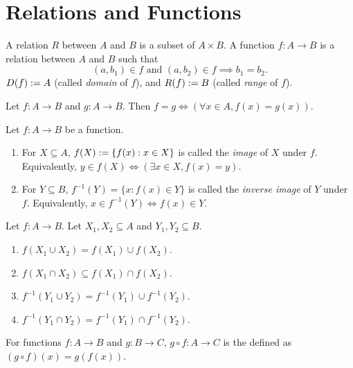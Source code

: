 \documentclass[a4paper, 12pt, fleqn]{article}
\begin{document}
\section{Relations and Functions}

\begin{definition}
A relation $R$ between $A$ and $B$ is a subset of $A \times B$.
A function $f: A \to B$ is a relation between $A$ and $B$ such that
\[ (a, b_1) \in f \textrm{ and } (a, b_2) \in f \implies b_1 = b_2. \]
$D(f) := A$ (called \emph{domain} of $f$),
and $R(f) := B$ (called \emph{range} of $f$).
\end{definition}

\begin{lemma}
Let $f: A \to B$ and $g: A \to B$.
Then $f = g \iff (\forall x \in A, f(x) = g(x))$.
\end{lemma}

\begin{definition}
Let $f: A \to B$ be a function.
\begin{enumerate}
\item For $X \subseteq A$, $f(X) := \{f(x): x \in X\}$ is called the \emph{image} of $X$ under $f$.
    \\ Equivalently, $y \in f(X) \iff (\exists x \in X, f(x) = y)$.
\item For $Y \subseteq B$, $f^{-1}(Y) = \{x: f(x) \in Y\}$ is called the \emph{inverse image}
    of $Y$ under $f$. Equivalently, $x \in f^{-1}(Y) \iff f(x) \in Y$.
\end{enumerate}
\end{definition}

\begin{lemma}
Let $f: A \to B$. Let $X_1, X_2 \subseteq A$ and $Y_1, Y_2 \subseteq B$.
\begin{enumerate}
\item $f(X_1 \cup X_2) = f(X_1) \cup f(X_2)$.
\item $f(X_1 \cap X_2) \subseteq f(X_1) \cap f(X_2)$.
\item $f^{-1}(Y_1 \cup Y_2) = f^{-1}(Y_1) \cup f^{-1}(Y_2)$.
\item $f^{-1}(Y_1 \cap Y_2) = f^{-1}(Y_1) \cap f^{-1}(Y_2)$.
\end{enumerate}
\end{lemma}

\begin{definition}[Composition]
\label{defn:func-compose}
For functions $f: A \to B$ and $g: B \to C$,
$g \circ f: A \to C$ is the defined as $(g \circ f)(x) = g(f(x))$.
\end{definition}
\end{document}
